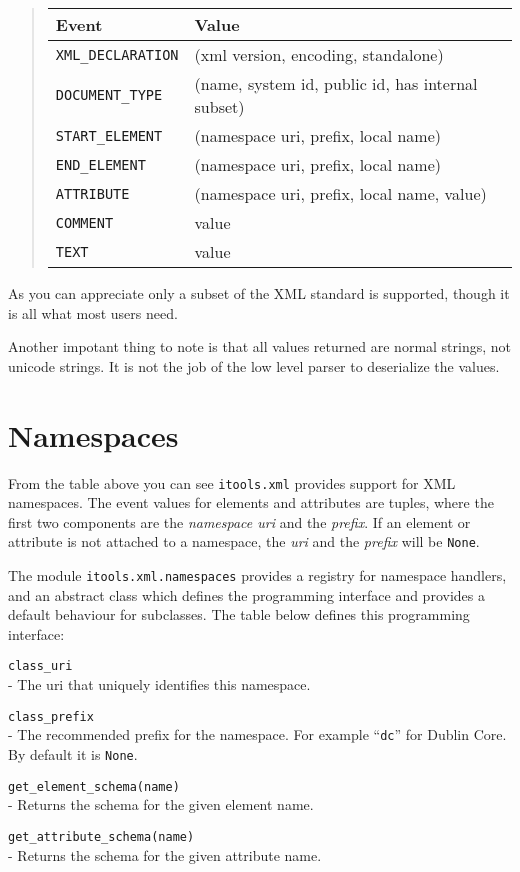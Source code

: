 \begin{quote}
  \begin{tabular}{ll}
    Event & Value\\\hline
    {\tt XML\_DECLARATION} & (xml version, encoding, standalone)\\
    {\tt DOCUMENT\_TYPE} & (name, system id, public id, has internal subset)\\
    {\tt START\_ELEMENT} & (namespace uri, prefix, local name)\\
    {\tt END\_ELEMENT} & (namespace uri, prefix, local name)\\
    {\tt ATTRIBUTE} & (namespace uri, prefix, local name, value)\\
    {\tt COMMENT} & value\\
    {\tt TEXT} & value\\
  \end{tabular}
\end{quote}

As you can appreciate only a subset of the XML standard is supported, though
it is all what most users need.

Another impotant thing to note is that all values returned are normal
strings, not unicode strings. It is not the job of the low level parser
to deserialize the values.


\section{Namespaces}

From the table above you can see {\tt itools.xml} provides support for XML
namespaces. The event values for elements and attributes are tuples, where
the first two components are the {\em namespace uri} and the {\em prefix}.
If an element or attribute is not attached to a namespace, the {\em uri}
and the {\em prefix} will be {\tt None}.

The module {\tt itools.xml.namespaces} provides a registry for namespace
handlers, and an abstract class which defines the programming interface
and provides a default behaviour for subclasses. The table below defines
this programming interface:

\begin{api}
    {\tt class\_uri}\\
    - The uri that uniquely identifies this namespace.

    {\tt class\_prefix}\\
    - The recommended prefix for the namespace. For example ``{\tt dc}''
      for Dublin Core. By default it is {\tt None}.

    {\tt get\_element\_schema(name)}\\
    - Returns the schema for the given element name.

    {\tt get\_attribute\_schema(name)}\\
    - Returns the schema for the given attribute name.
\end{api}

